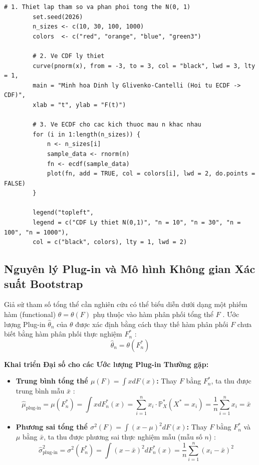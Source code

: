 \begin{enumerate}
	\begin{lstlisting}[style=Rstyle, caption={Mô phỏng ECDF}]
		# 1. Thiet lap tham so va phan phoi tong the N(0, 1)
		set.seed(2026)
		n_sizes <- c(10, 30, 100, 1000)
		colors  <- c("red", "orange", "blue", "green3")
		
		# 2. Ve CDF ly thiet
		curve(pnorm(x), from = -3, to = 3, col = "black", lwd = 3, lty = 1,
		main = "Minh hoa Dinh ly Glivenko-Cantelli (Hoi tu ECDF -> CDF)",
		xlab = "t", ylab = "F(t)")
		
		# 3. Ve ECDF cho cac kich thuoc mau n khac nhau
		for (i in 1:length(n_sizes)) {
			n <- n_sizes[i]
			sample_data <- rnorm(n)
			fn <- ecdf(sample_data)
			plot(fn, add = TRUE, col = colors[i], lwd = 2, do.points = FALSE)
		}
		
		legend("topleft", 
		legend = c("CDF Ly thiet N(0,1)", "n = 10", "n = 30", "n = 100", "n = 1000"),
		col = c("black", colors), lty = 1, lwd = 2)
	\end{lstlisting}
	\end{enumerate}
	
	
	\subsection{Nguyên lý Plug-in và Mô hình Không gian Xác suất Bootstrap}
	
	\begin{definition}
		Giả sử tham số tổng thể cần nghiên cứu có thể biểu diễn dưới dạng một phiếm hàm (functional) $\theta = \theta(F)$ phụ thuộc vào hàm phân phối tổng thể $F$ \cite{buithuytrang2026}. Ước lượng Plug-in $\hat{\theta}_n$ của $\theta$ được xác định bằng cách thay thế hàm phân phối $F$ chưa biết bằng hàm phân phối thực nghiệm $F_n^*$ \cite{buithuytrang2026}:
		\begin{equation}
			\hat{\theta}_n = \theta(F_n^*)
		\end{equation}
	\end{definition}
	
	\textbf{Khai triển Đại số cho các Ước lượng Plug-in Thường gặp:}
	\begin{itemize}
		\item \textbf{Trung bình tổng thể $\mu(F) = \int x dF(x)$:} Thay $F$ bằng $F_n^*$, ta thu được trung bình mẫu $\bar{x}$ \cite{buithuytrang2026}:
		\begin{equation}
			\hat{\mu}_{\text{plug-in}} = \mu(F_n^*) = \int x dF_n^*(x) = \sum_{i=1}^n x_i \cdot \mathbb{P}_X^*(X^* = x_i) = \frac{1}{n}\sum_{i=1}^n x_i = \bar{x}
		\end{equation}
		\item \textbf{Phương sai tổng thể $\sigma^2(F) = \int (x - \mu)^2 dF(x)$:} Thay $F$ bằng $F_n^*$ và $\mu$ bằng $\bar{x}$, ta thu được phương sai thực nghiệm mẫu (mẫu số $n$) \cite{buithuytrang2026}:
		\begin{equation}
			\hat{\sigma}^2_{\text{plug-in}} = \sigma^2(F_n^*) = \int (x - \bar{x})^2 dF_n^*(x) = \frac{1}{n}\sum_{i=1}^n (x_i - \bar{x})^2
		\end{equation}
	\end{itemize}
	
